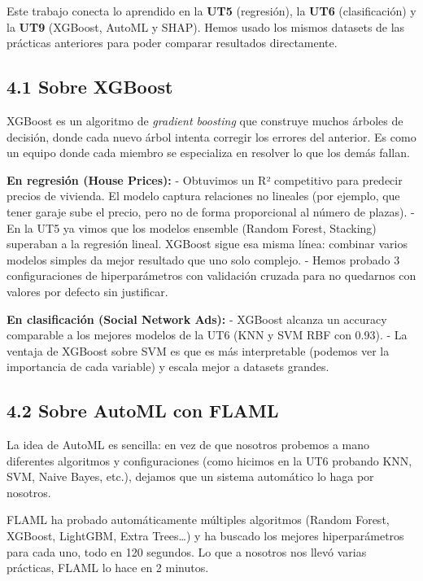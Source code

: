 \documentclass[11pt]{article}
\begin{document}
Este trabajo conecta lo aprendido en la \textbf{UT5} (regresión), la
\textbf{UT6} (clasificación) y la \textbf{UT9} (XGBoost, AutoML y SHAP).
Hemos usado los mismos datasets de las prácticas anteriores para poder
comparar resultados directamente.

\subsection{4.1 Sobre XGBoost}\label{sobre-xgboost}

XGBoost es un algoritmo de \emph{gradient boosting} que construye muchos
árboles de decisión, donde cada nuevo árbol intenta corregir los errores
del anterior. Es como un equipo donde cada miembro se especializa en
resolver lo que los demás fallan.

\textbf{En regresión (House Prices):} - Obtuvimos un R² competitivo para
predecir precios de vivienda. El modelo captura relaciones no lineales
(por ejemplo, que tener garaje sube el precio, pero no de forma
proporcional al número de plazas). - En la UT5 ya vimos que los modelos
ensemble (Random Forest, Stacking) superaban a la regresión lineal.
XGBoost sigue esa misma línea: combinar varios modelos simples da mejor
resultado que uno solo complejo. - Hemos probado 3 configuraciones de
hiperparámetros con validación cruzada para no quedarnos con valores por
defecto sin justificar.

\textbf{En clasificación (Social Network Ads):} - XGBoost alcanza un
accuracy comparable a los mejores modelos de la UT6 (KNN y SVM RBF con
0.93). - La ventaja de XGBoost sobre SVM es que es más interpretable
(podemos ver la importancia de cada variable) y escala mejor a datasets
grandes.

\subsection{4.2 Sobre AutoML con FLAML}\label{sobre-automl-con-flaml}

La idea de AutoML es sencilla: en vez de que nosotros probemos a mano
diferentes algoritmos y configuraciones (como hicimos en la UT6 probando
KNN, SVM, Naive Bayes, etc.), dejamos que un sistema automático lo haga
por nosotros.

FLAML ha probado automáticamente múltiples algoritmos (Random Forest,
XGBoost, LightGBM, Extra Trees\ldots) y ha buscado los mejores
hiperparámetros para cada uno, todo en 120 segundos. Lo que a nosotros
nos llevó varias prácticas, FLAML lo hace en 2 minutos.
\end{document}

